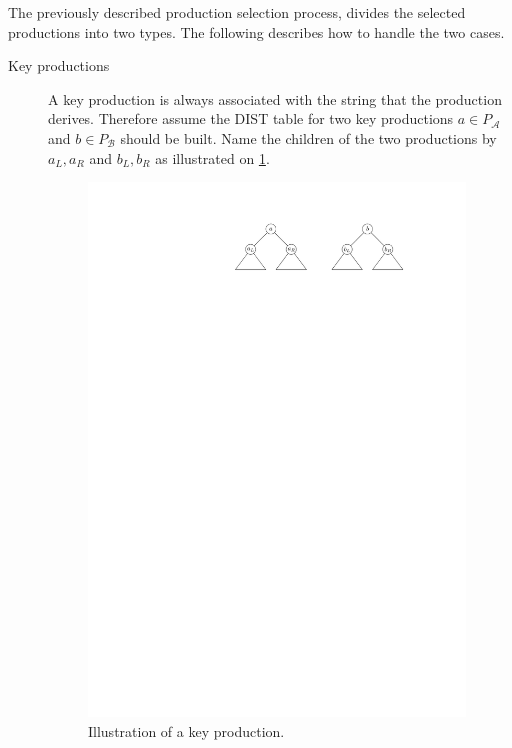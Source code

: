 \documentclass[twoside,11pt,openright]{report}
\begin{document}
The previously described production selection process, divides the selected productions into two types. The following describes how to handle the two cases.
\\
\begin{description}
  \item[Key productions] A key production is always associated with the string that the production derives. Therefore assume the DIST table for two key productions $a \in P_{\mathcal{A}}$ and $b \in P_{\mathcal{B}}$ should be built. Name the children of the two productions by $a_L, a_R$ and $b_L, b_R$ as illustrated on \cref{fig:distrepo-key}.
  
  \begin{figure}[h!]
    \centering
    \includegraphics[width=10cm]{images/distrepo-key}
    \caption{Illustration of a key production.}
    \label{fig:distrepo-key}
  \end{figure}
  

\end{description}
\end{document}
